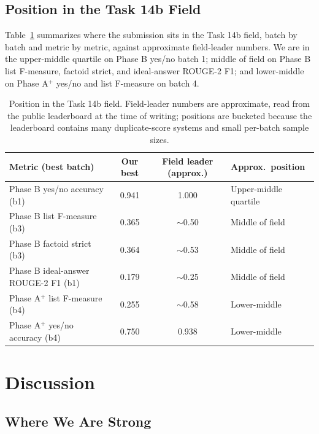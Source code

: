 \documentclass[sigconf,natbib=true]{ceurart}
\begin{document}
\subsection{Position in the Task 14b Field}

Table~\ref{tab:position} summarizes where the submission sits in the Task 14b field, batch by batch and metric by metric, against approximate field-leader numbers. We are in the upper-middle quartile on Phase B yes/no batch 1; middle of field on Phase B list F-measure, factoid strict, and ideal-answer ROUGE-2 F1; and lower-middle on Phase A$^+$ yes/no and list F-measure on batch 4.

\begin{table}[t]
\centering
\small
\begin{tabular}{lccl}
\toprule
\textbf{Metric (best batch)} & \textbf{Our best} & \textbf{Field leader (approx.)} & \textbf{Approx.\ position} \\
\midrule
Phase B yes/no accuracy (b1)             & 0.941 & 1.000 & Upper-middle quartile \\
Phase B list F-measure (b3)              & 0.365 & $\sim$0.50 & Middle of field \\
Phase B factoid strict (b3)              & 0.364 & $\sim$0.53 & Middle of field \\
Phase B ideal-answer ROUGE-2 F1 (b1)     & 0.179 & $\sim$0.25 & Middle of field \\
Phase A$^+$ list F-measure (b4)          & 0.255 & $\sim$0.58 & Lower-middle \\
Phase A$^+$ yes/no accuracy (b4)         & 0.750 & 0.938 & Lower-middle \\
\bottomrule
\end{tabular}
\caption{Position in the Task 14b field. Field-leader numbers are approximate, read from the public leaderboard at the time of writing; positions are bucketed because the leaderboard contains many duplicate-score systems and small per-batch sample sizes.}
\label{tab:position}
\end{table}


\section{Discussion}
\label{sec:discussion}

\subsection{Where We Are Strong}
\end{document}
